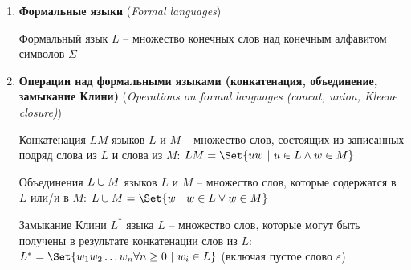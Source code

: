 \documentclass[12pt]{article}
\begin{document}
\begin{enumerate}
        Главное отличие НКА от ДКА: от одного состояния в НКА можно перейти сразу к нескольким другим или к ни одному

        Пример:

        \begin{multicols}{2}

            \begin{tabular}{c|cc}
                & $0$              & $1$         \\
                \hline
                $\to q_0$ & $\Set{q_0, q_1}$ & $\Set{q_0}$ \\
                \hline
                $q_1$     & $\emptyset$      & $\Set{q_1}$ \\
                \hline
                $*q_2$    & $\emptyset$      & $\emptyset$
            \end{tabular}

        \end{multicols}

        \item \textbf{Формальные языки} (\textit{Formal languages})

        Формальный язык $L$ -- множество конечных слов над конечным алфавитом символов $\Sigma$

        \item \textbf{Операции над формальными языками (конкатенация, объединение, замыкание Клини)} (\textit{Operations on formal languages (concat, union, Kleene closure)})

        Конкатенация $LM$ языков $L$ и $M$ -- множество слов, состоящих из записанных подряд слова из $L$ и слова из $M$: $LM = \Set{uw \ | \ u \in L \land w \in M}$

        Объединения $L \cup M$ языков $L$ и $M$ -- множество слов, которые содержатся в $L$ или/и в $M$: $L \union M = \Set{w \ | \ w \in L \lor w \in M}$

        Замыкание Клини $L^*$ языка $L$ -- множество слов, которые могут быть получены в результате конкатенации слов из $L$: $L^* = \Set{w_1 w_2 \dots w_n \forall n \geq 0 \ | \ w_i \in L}$ (включая пустое слово $\varepsilon$)


\end{enumerate}
\end{document}
